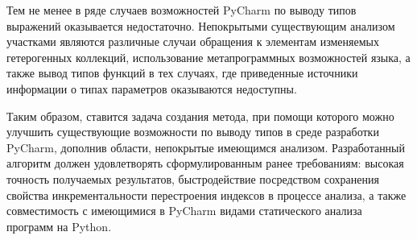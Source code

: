 Тем не менее в ряде случаев возможностей PyCharm по выводу типов выражений
оказывается недостаточно. Непокрытыми существующим анализом участками являются
различные случаи обращения к элементам изменяемых гетерогенных коллекций,
использование метапрограммных возможностей языка, а также вывод типов функций в
тех случаях, где приведенные источники информации о типах параметров оказываются
недоступны.

Таким образом, ставится задача создания метода, при помощи которого можно
улучшить существующие возможности по выводу типов в среде разработки PyCharm,
дополнив области, непокрытые имеющимся анализом. Разработанный алгоритм должен
удовлетворять сформулированным ранее требованиям: высокая точность получаемых
результатов, быстродействие посредством сохранения свойства инкрементальности
перестроения индексов в процессе анализа, а также совместимость с имеющимися в
PyCharm видами статического анализа программ на Python.
